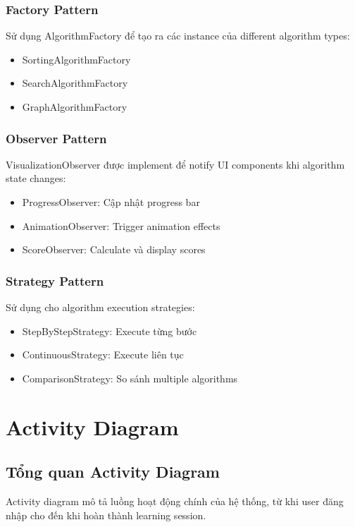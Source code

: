 \subsubsection{Factory Pattern}
Sử dụng AlgorithmFactory để tạo ra các instance của different algorithm types:
\begin{itemize}
    \item SortingAlgorithmFactory
    \item SearchAlgorithmFactory  
    \item GraphAlgorithmFactory
\end{itemize}

\subsubsection{Observer Pattern}
VisualizationObserver được implement để notify UI components khi algorithm state changes:
\begin{itemize}
    \item ProgressObserver: Cập nhật progress bar
    \item AnimationObserver: Trigger animation effects
    \item ScoreObserver: Calculate và display scores
\end{itemize}

\subsubsection{Strategy Pattern}
Sử dụng cho algorithm execution strategies:
\begin{itemize}
    \item StepByStepStrategy: Execute từng bước
    \item ContinuousStrategy: Execute liên tục
    \item ComparisonStrategy: So sánh multiple algorithms
\end{itemize}

\section{Activity Diagram}
\label{sec:activity-diagram}

\subsection{Tổng quan Activity Diagram}
\label{subsec:activity-overview}

Activity diagram mô tả luồng hoạt động chính của hệ thống, từ khi user đăng nhập cho đến khi hoàn thành learning session.

